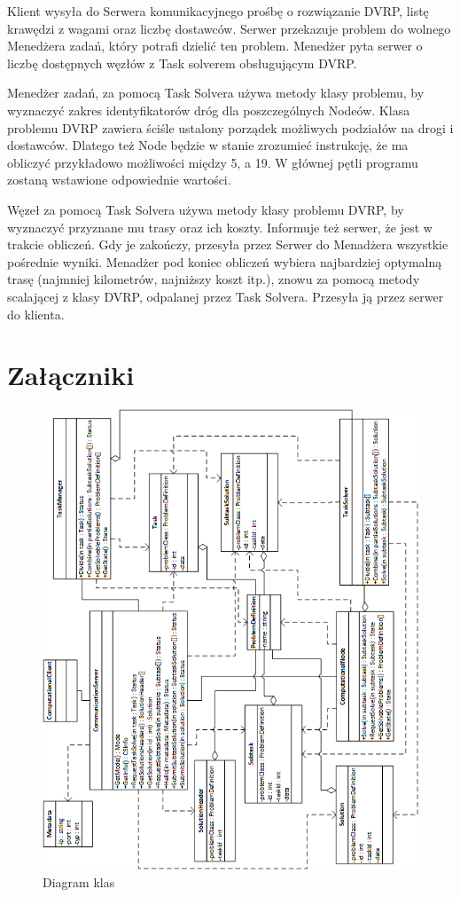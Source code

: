 \documentclass[12pt,a4paper,titlepage]{report}
\begin{document}
		Klient wysyła do Serwera komunikacyjnego prośbę o rozwiązanie DVRP, listę krawędzi z wagami oraz liczbę dostawców. Serwer przekazuje problem do wolnego Menedżera zadań, który potrafi dzielić ten problem. Menedżer pyta serwer o liczbę dostępnych węzłów z Task solverem obsługującym DVRP.
		
		Menedżer zadań, za pomocą Task Solvera używa metody klasy problemu, by wyznaczyć zakres identyfikatorów dróg dla poszczególnych Nodeów. Klasa problemu DVRP zawiera ściśle ustalony porządek możliwych podziałów na drogi i dostawców. Dlatego też Node będzie w stanie zrozumieć instrukcję, że ma obliczyć przykładowo możliwości między 5, a 19. W głównej pętli programu zostaną wstawione odpowiednie wartości.
		
		Węzeł za pomocą Task Solvera używa metody klasy problemu DVRP, by wyznaczyć przyznane mu trasy oraz ich koszty. Informuje też serwer, że jest w trakcie obliczeń. Gdy je zakończy, przesyła przez Serwer do Menadżera wszystkie pośrednie wyniki. Menadżer pod koniec obliczeń wybiera najbardziej optymalną trasę (najmniej kilometrów, najniższy koszt  itp.), znowu za pomocą metody scalającej z klasy DVRP, odpalanej przez Task Solvera. Przesyła ją przez serwer do klienta.
		
\chapter{Załączniki}
	\begin{figure}[h]
		\centering
		 \includegraphics[width=\textwidth]{img/ClassDiagram.png}
		 \caption{Diagram klas}
	\end{figure} 	
	
\end{document}
